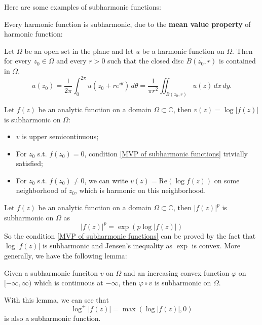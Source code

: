 Here are some examples of subharmonic functions:
\begin{example}
Every harmonic function is subharmonic, due to the \textbf{mean value property} of harmonic function:
\begin{theorem}
Let $\Omega$ be an open set in the plane and let $u$ be a harmonic function on $\Omega$. Then for
every $z_0\in\Omega$ and every $r>0$ such that the closed disc $\overline{B(z_0,r)}$ is contained
in $\Omega$,
\begin{equation*}
  u(z_0) = \frac{1}{2\pi}\int_0^{2\pi} u(z_0+re^{i\theta})\, d\theta
  = \frac{1}{\pi r^2} \iint_{B(z_0,r)} u(z)\, dx\, dy.
\end{equation*}
\end{theorem}
\end{example}
\begin{example}\label{log |f| is subharmonic}
Let $f(z)$ be an analytic function on a domain $\Omega\subset \mathbb{C}$, then 
$v(z)=\log |f(z)|$ is subharmonic on $\Omega$: 
\begin{itemize}
  \item $v$ is upper semicontinuous;
  \item For $z_0$ s.t. $f(z_0)=0$, condition \ref{MVP of subharmonic functions} trivially
  satisfied;
  \item For $z_0$ s.t. $f(z_0)\neq 0$, we can write $v(z)=\text{Re}(\log f(z))$ on some neighborhood
  of $z_0$, which is harmonic on this neighborhood.
\end{itemize}
\end{example}
\begin{example}
Let $f(z)$ be an analytic function on a domain $\Omega\subset \mathbb{C}$, then 
$|f(z)|^p$ is subharmonic on $\Omega$ as 
\begin{equation*}
  |f(z)|^p=\exp(p \log |f(z)|)
\end{equation*}
So the condition \ref{MVP of subharmonic functions} can be proved by the fact that
$\log |f(z)|$ is subharmonic and Jensen's inequality as $\exp$ is convex. More generally, we
have the following lemma:
\begin{lemma}
Given a subharmonic funciton $v$ on $\Omega$ and an increasing convex function $\varphi$ on
$[-\infty, \infty)$ which is continuous at $-\infty$, then $\varphi\circ v$ is subharmonic on
$\Omega$.
\end{lemma}
With this lemma, we can see that
\begin{equation*}
    \log^+ |f(z)|=\max(\log |f(z)|,0)
\end{equation*}
is also a subharmonic function.
\end{example}

